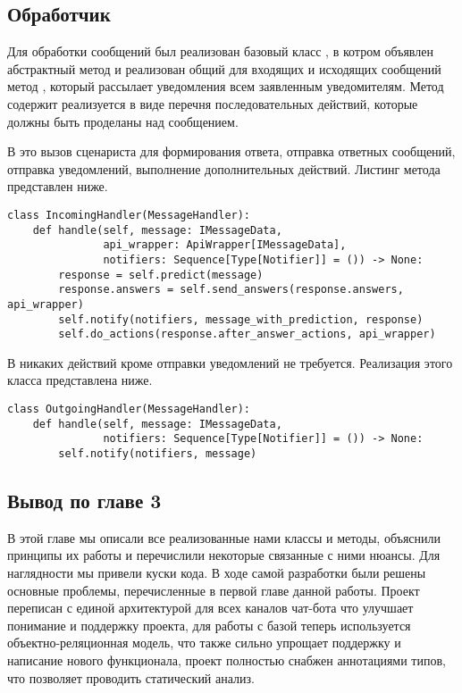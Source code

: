     \subsection{Обработчик}
    Для обработки сообщений был реализован базовый класс , в котром объявлен
    абстрактный метод  и реализован общий для входящих и исходящих сообщений
    метод , который рассылает уведомления всем заявленным уведомителям.
    Метод  содержит реализуется в виде перечня последовательных действий,
    которые должны быть проделаны над сообщением.

    В  это вызов сценариста для формирования ответа, отправка ответных сообщений,
    отправка уведомлений, выполнение дополнительных действий. Листинг метода представлен ниже.
\begin{lstlisting}
class IncomingHandler(MessageHandler):
    def handle(self, message: IMessageData,
               api_wrapper: ApiWrapper[IMessageData],
               notifiers: Sequence[Type[Notifier]] = ()) -> None:
        response = self.predict(message)
        response.answers = self.send_answers(response.answers, api_wrapper)
        self.notify(notifiers, message_with_prediction, response)
        self.do_actions(response.after_answer_actions, api_wrapper)
\end{lstlisting}

    В  никаких действий кроме отправки уведомлений не требуется.
    Реализация этого класса представлена ниже.
\begin{lstlisting}
class OutgoingHandler(MessageHandler):
    def handle(self, message: IMessageData,
               notifiers: Sequence[Type[Notifier]] = ()) -> None:
        self.notify(notifiers, message)
\end{lstlisting}

    \subsection*{Вывод по главе 3}
    В этой главе мы описали все реализованные нами классы и методы, объяснили принципы
    их работы и перечислили некоторые связанные с ними нюансы. Для наглядности мы привели
    куски кода.
    В ходе самой разработки были решены основные проблемы, перечисленные в первой главе данной работы.
    Проект переписан с единой архитектурой для всех каналов чат-бота что улучшает понимание и поддержку
    проекта, для работы с базой теперь используется объектно-реляционная модель, что также сильно
    упрощает поддержку и написание нового функционала,
    проект полностью снабжен аннотациями типов, что позволяет проводить статический анализ.
